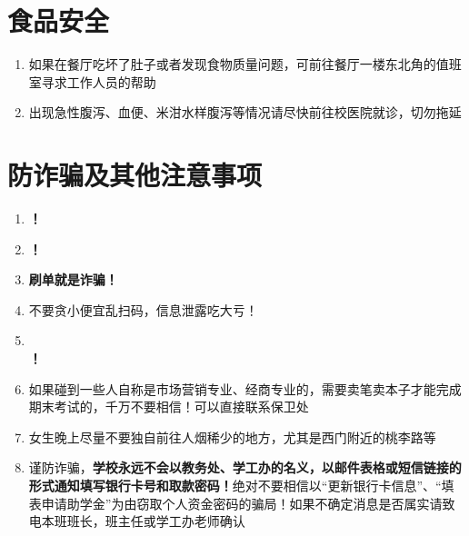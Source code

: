 \section[食品安全]{食品安全}
\begin{enumerate}
    \item 如果在餐厅吃坏了肚子或者发现食物质量问题，可前往餐厅一楼东北角的值班室寻求工作人员的帮助
    \item 出现急性腹泻、血便、米泔水样腹泻等情况请尽快前往校医院就诊，切勿拖延
\end{enumerate}

\section[防诈骗及其他注意事项]{防诈骗及其他注意事项}
\begin{enumerate}
    \item \textbf{！}
    \item \textbf{！}
    \item \textbf{刷单就是诈骗！}
    \item 不要贪小便宜乱扫码，信息泄露吃大亏！
    \item \textbf{\\！}
    \item 如果碰到一些人自称是市场营销专业、经商专业的，需要卖笔卖本子\footnotemark 才能完成期末考试的，千万不要相信！可以直接联系保卫处
    \item 女生晚上尽量不要独自前往人烟稀少的地方，尤其是西门附近的桃李路等
    \item 谨防诈骗，\textbf{学校永远不会以教务处、学工办的名义，以邮件表格或短信链接的形式通知填写银行卡号和取款密码！}绝对不要相信以“更新银行卡信息”、“填表申请助学金”为由窃取个人资金密码的骗局！如果不确定消息是否属实请致电本班班长，班主任或学工办老师确认
\end{enumerate}
